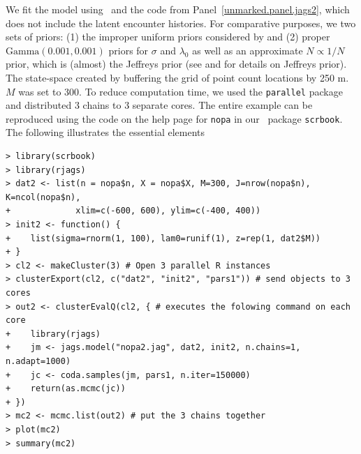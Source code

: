 We fit the model using \jags~and the code from
Panel~\ref{unmarked.panel.jags2}, which does not include the latent
encounter histories. For comparative purposes, we two sets of priors:
(1) the improper uniform priors considered by
\citet{chandler_royle:2012} and (2) proper $\text{Gamma}(0.001,0.001)$
priors for $\sigma$ and $\lambda_0$ as well as an approximate
$N \propto 1/N$ prior, which is (almost) the Jeffreys prior (see
\citet{link:2013} and \citet{link_barker:2010} for details on Jeffreys
prior).
The state-space created by buffering the grid of point count
locations by 250 m. $M$ was set to 300.
To reduce computation time, we used the \texttt{parallel} package and
distributed 3 chains to 3 separate cores. The entire example can be
reproduced using the code on the help page for \verb+nopa+ in our
\R~package \texttt{scrbook}. The following illustrates the essential
elements
\begin{small}
\begin{verbatim}
> library(scrbook)
> library(rjags)
> dat2 <- list(n = nopa$n, X = nopa$X, M=300, J=nrow(nopa$n), K=ncol(nopa$n),
+             xlim=c(-600, 600), ylim=c(-400, 400))
> init2 <- function() {
+    list(sigma=rnorm(1, 100), lam0=runif(1), z=rep(1, dat2$M))
+ }
> cl2 <- makeCluster(3) # Open 3 parallel R instances
> clusterExport(cl2, c("dat2", "init2", "pars1")) # send objects to 3 cores
> out2 <- clusterEvalQ(cl2, { # executes the folowing command on each core
+    library(rjags)
+    jm <- jags.model("nopa2.jag", dat2, init2, n.chains=1, n.adapt=1000)
+    jc <- coda.samples(jm, pars1, n.iter=150000)
+    return(as.mcmc(jc))
+ })
> mc2 <- mcmc.list(out2) # put the 3 chains together
> plot(mc2)
> summary(mc2)
\end{verbatim}
\end{small}




